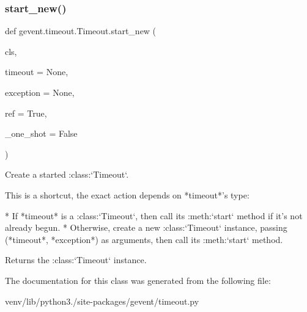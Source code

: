\subsubsection{\texorpdfstring{start\+\_\+new()}{start\_new()}}
{\footnotesize\ttfamily def gevent.\+timeout.\+Timeout.\+start\+\_\+new (\begin{DoxyParamCaption}\item[{}]{cls,  }\item[{}]{timeout = {\ttfamily None},  }\item[{}]{exception = {\ttfamily None},  }\item[{}]{ref = {\ttfamily True},  }\item[{}]{\+\_\+one\+\_\+shot = {\ttfamily False} }\end{DoxyParamCaption})}

\begin{DoxyVerb}Create a started :class:`Timeout`.

This is a shortcut, the exact action depends on *timeout*'s type:

* If *timeout* is a :class:`Timeout`, then call its :meth:`start` method
  if it's not already begun.
* Otherwise, create a new :class:`Timeout` instance, passing (*timeout*, *exception*) as
  arguments, then call its :meth:`start` method.

Returns the :class:`Timeout` instance.
\end{DoxyVerb}
 

The documentation for this class was generated from the following file\+:\begin{DoxyCompactItemize}
\item 
venv/lib/python3./site-\/packages/gevent/timeout.\+py\end{DoxyCompactItemize}
